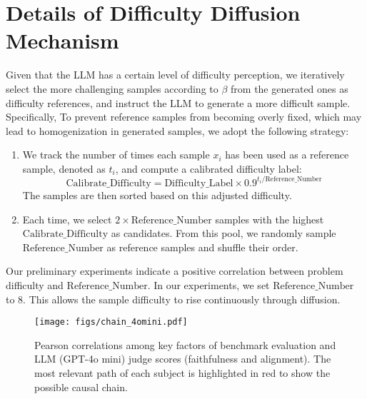 \section{Details of Difficulty Diffusion Mechanism}
\label{sec:ddd}
Given that the LLM has a certain level of difficulty perception, we iteratively select the more challenging samples according to $\beta$ from the generated ones as difficulty references, and instruct the LLM to generate a more difficult sample. 
Specifically,
To prevent reference samples from becoming overly fixed, which may lead to homogenization in generated samples, we adopt the following strategy:
\begin{enumerate}
    \item We track the number of times each sample \( x_i \) has been used as a reference sample, denoted as \( t_i \), and compute a calibrated difficulty label:
    \begin{equation}
        \text{Calibrate\_Difficulty} = \text{Difficulty\_Label} \times 0.9^{t_i / \text{Reference\_Number}}
    \end{equation}
    The samples are then sorted based on this adjusted difficulty.

    \item Each time, we select \( 2 \times \text{Reference\_Number} \) samples with the highest \( \text{Calibrate\_Difficulty} \) as candidates. From this pool, we randomly sample \( \text{Reference\_Number} \) as reference samples and shuffle their order.
\end{enumerate}
Our preliminary experiments indicate a positive correlation between problem difficulty and \( \text{Reference\_Number} \). In our experiments, we set \( \text{Reference\_Number} \) to 8.
This allows the sample difficulty to rise continuously through diffusion.

\begin{figure*}[h]
\centering
\texttt{[image: figs/chain\_4omini.pdf]}
\vspace{-10pt}
\caption{{Pearson correlations among key factors of benchmark evaluation and LLM (GPT-4o mini) judge scores (faithfulness and alignment). The most relevant path of each subject is highlighted in red to show the possible causal chain.}}
\vspace{-7pt}
\label{fig:chain_4omini}
\end{figure*}

